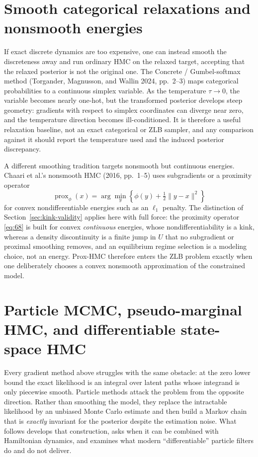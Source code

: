 \documentclass[11pt]{article}
\begin{document}
\section{Smooth categorical relaxations and nonsmooth energies}\label{sec:relaxations}

If exact discrete dynamics are too expensive, one can instead smooth the
discreteness away and run ordinary HMC on the relaxed target, accepting
that the relaxed posterior is not the original one. The Concrete /
Gumbel-softmax method (Torgander, Magnusson, and Wallin 2024, pp.~2--3) maps
categorical probabilities to a continuous simplex variable. As the
temperature $\tau\to0$, the variable becomes nearly one-hot, but the
transformed posterior develops steep geometry: gradients with respect to
simplex coordinates can diverge near zero, and the temperature direction
becomes ill-conditioned. It is therefore a useful relaxation baseline, not
an exact categorical or ZLB sampler, and any comparison against it should
report the temperature used and the induced posterior discrepancy.

A different smoothing tradition targets nonsmooth but continuous energies.
Chaari et al.'s nonsmooth HMC (2016, pp.~1--5) uses subgradients or a
proximity operator
\begin{equation}\label{eq:68}
 \operatorname{prox}_{\phi}(x)=
 \arg\min_y\left\{\phi(y)+\tfrac12\|y-x\|^2\right\}
\end{equation}
for convex nondifferentiable energies such as an $\ell_1$ penalty. The
distinction of Section~\ref{sec:kink-validity} applies here with full force:
the proximity operator \eqref{eq:68} is built for convex \emph{continuous}
energies, whose nondifferentiability is a kink, whereas a density
discontinuity is a finite jump in $U$ that no subgradient or proximal
smoothing removes, and an equilibrium regime selection is a modeling choice,
not an energy. Prox-HMC therefore enters the ZLB problem exactly when one
deliberately chooses a convex nonsmooth approximation of the constrained
model.

\section{Particle MCMC, pseudo-marginal HMC, and differentiable state-space HMC}\label{sec:pmcmc}

Every gradient method above struggles with the same obstacle: at
the zero lower bound the exact likelihood is an integral over latent paths
whose integrand is only piecewise smooth. Particle methods attack the problem
from the opposite direction. Rather than smoothing the model, they replace the
intractable likelihood by an unbiased Monte Carlo estimate and then build a
Markov chain that is \emph{exactly} invariant for the posterior despite the
estimation noise. What follows develops that construction, asks when it can
be combined with Hamiltonian dynamics, and examines what modern
``differentiable'' particle filters do and do not deliver.
\end{document}
